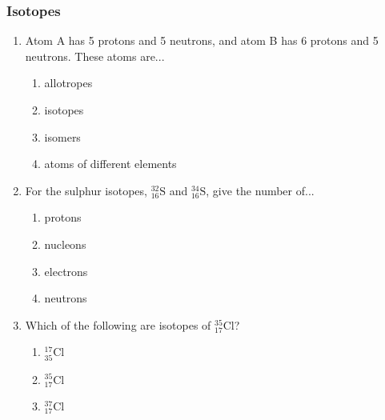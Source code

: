     \noindent
            \subsubsection{  Isotopes }
            \nopagebreak
        \label{m38753*id258162}\begin{enumerate}[noitemsep, label=\textbf{\arabic*}. ] 
            \label{m38753*uid50}\item Atom A has 5 protons and 5 neutrons, and atom B has 6 protons and 5 neutrons. These atoms are...
\label{m38753*id258178}\begin{enumerate}[noitemsep, label=\textbf{\alph*}. ] 
            \label{m38753*uid51}\item allotropes
\label{m38753*uid52}\item isotopes
\label{m38753*uid53}\item isomers
\label{m38753*uid54}\item atoms of different elements
\end{enumerate}
                \label{m38753*uid55}\item For the sulphur isotopes, $_{16}^{32}\mathrm{S}$ and $_{16}^{34}\mathrm{S}$, give the number of...
\label{m38753*id258277}\begin{enumerate}[noitemsep, label=\textbf{\alph*}. ] 
            \label{m38753*uid56}\item protons
\label{m38753*uid57}\item nucleons
\label{m38753*uid58}\item electrons
\label{m38753*uid59}\item neutrons
\end{enumerate}
                \label{m38753*uid60}\item Which of the following are isotopes of $_{17}^{35}\mathrm{Cl}$?
\label{m38753*id258355}\begin{enumerate}[noitemsep, label=\textbf{\alph*}. ] 
            \label{m38753*uid61}\item $_{35}^{17}\mathrm{Cl}$
\label{m38753*uid62}\item $_{17}^{35}\mathrm{Cl}$
\label{m38753*uid63}\item $_{17}^{37}\mathrm{Cl}$

\end{enumerate}
\end{enumerate}
